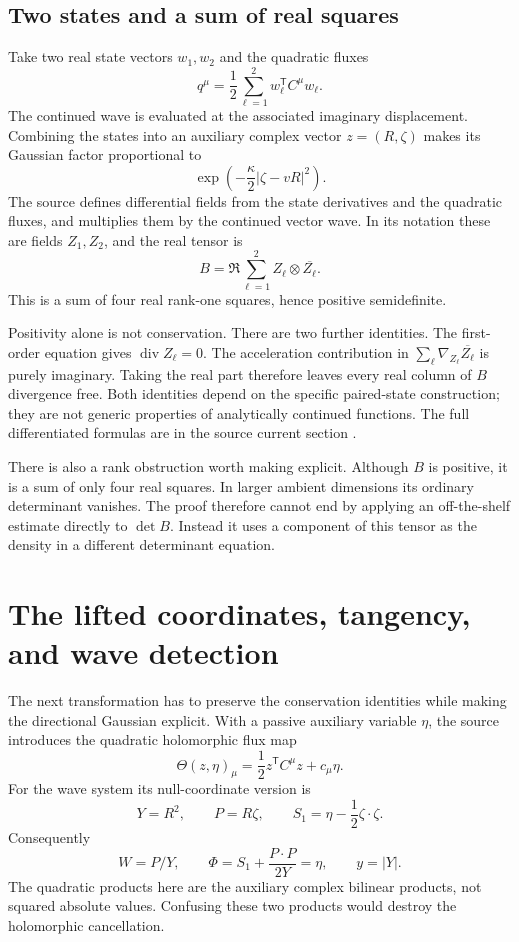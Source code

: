 \documentclass[11pt,a4paper]{article}
\numberwithin{equation}{section}
\theoremstyle{definition}
\theoremstyle{remark}
\newcommand{\diver}{\operatorname{div}}
\begin{document}
\subsection{Two states and a sum of real squares}
Take two real state vectors $w_1,w_2$ and the quadratic fluxes
\[
 q^\mu=\frac12\sum_{\ell=1}^2 w_\ell^{\mathsf T}C^\mu w_\ell.
\]
The continued wave is evaluated at the associated imaginary displacement.
Combining the states into an auxiliary complex vector $z=(R,\zeta)$ makes
its Gaussian factor proportional to
\[
 \exp\left(-\frac\kappa2|\zeta-vR|^2\right).
\]
The source defines differential fields from the state derivatives and the
quadratic fluxes, and multiplies them by the continued vector wave. In its
notation these are fields $Z_1,Z_2$, and the real tensor is
\begin{equation}\label{eq:realcurrent}
 B=\Re\sum_{\ell=1}^2 Z_\ell\otimes\overline{Z_\ell}.
\end{equation}
This is a sum of four real rank-one squares, hence positive semidefinite.

Positivity alone is not conservation. There are two further identities. The
first-order equation gives $\diver Z_\ell=0$. The acceleration contribution
in $\sum_\ell\nabla_{Z_\ell}\overline{Z_\ell}$ is purely imaginary.
Taking the real part therefore leaves every real column of $B$ divergence
free. Both identities depend on the specific paired-state construction;
they are not generic properties of analytically continued functions.
The full differentiated formulas are in the source current section
\cite{current}.

There is also a rank obstruction worth making explicit. Although $B$ is
positive, it is a sum of only four real squares. In larger ambient dimensions
its ordinary determinant vanishes. The proof therefore cannot end by applying
an off-the-shelf estimate directly to $\det B$. Instead it uses a component of
this tensor as the density in a different determinant equation.

\section{The lifted coordinates, tangency, and wave detection}
\label{sec:lift}
The next transformation has to preserve the conservation identities while
making the directional Gaussian explicit. With a passive auxiliary variable
$\eta$, the source introduces the quadratic holomorphic flux map
\[
 \Theta(z,\eta)_\mu=\frac12z^{\mathsf T}C^\mu z+c_\mu\eta.
\]
For the wave system its null-coordinate version is
\[
 Y=R^2,\qquad P=R\zeta,\qquad S_1=\eta-\frac12\zeta\cdot\zeta.
\]
Consequently
\begin{equation}\label{eq:firstintegral}
 W=P/Y,\qquad
 \Phi=S_1+\frac{P\cdot P}{2Y}=\eta,
 \qquad y=|Y|.
\end{equation}
The quadratic products here are the auxiliary complex bilinear products,
not squared absolute values. Confusing these two products would destroy the
holomorphic cancellation.
\end{document}
